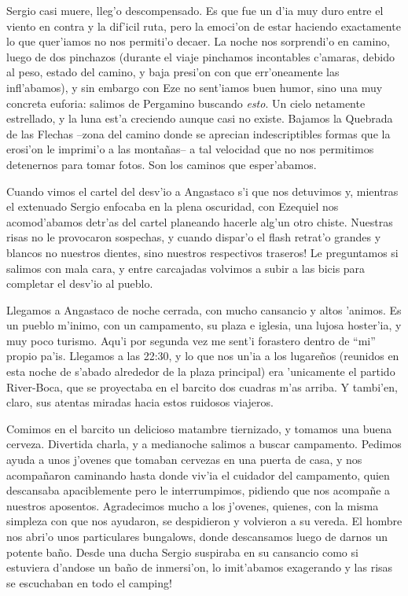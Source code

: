 Sergio casi muere, lleg'o descompensado. Es que fue un d'ia muy duro entre el
viento en contra y la dif'icil ruta, pero la emoci'on de estar haciendo
exactamente lo que quer'iamos no nos permiti'o decaer. La noche nos sorprendi'o
en camino, luego de dos pinchazos (durante el viaje pinchamos incontables
c'amaras, debido al peso, estado del camino, y baja presi'on con que
err'oneamente las infl'abamos), y sin embargo con Eze no sent'iamos buen humor,
sino una muy concreta euforia: salimos de Pergamino buscando \emph{esto}. Un
cielo netamente estrellado, y la luna est'a creciendo aunque casi no existe.
Bajamos la Quebrada de las Flechas --zona del camino donde se aprecian
indescriptibles formas que la erosi'on le imprimi'o a las monta\~nas-- a tal
velocidad que no nos permitimos detenernos para tomar fotos. Son los caminos que
esper'abamos.

Cuando vimos el cartel del desv'io a Angastaco s'i que nos detuvimos y, mientras
el extenuado Sergio enfocaba en la plena oscuridad, con Ezequiel nos
acomod'abamos detr'as del cartel planeando hacerle alg'un otro chiste. Nuestras
risas no le provocaron sospechas, y cuando dispar'o el flash retrat'o grandes y
blancos no nuestros dientes, \textexclamdown sino nuestros respectivos traseros!
Le preguntamos si salimos con mala cara, y entre carcajadas volvimos a subir a
las bicis para completar el desv'io al pueblo.

Llegamos a Angastaco de noche cerrada, con mucho cansancio y altos 'animos. Es
un pueblo m'inimo, con un campamento, su plaza e iglesia, una lujosa hoster'ia,
y muy poco turismo. Aqu'i por segunda vez me sent'i forastero dentro de ``mi''
propio pa'is. Llegamos a las 22:30, y lo que nos un'ia a los lugare\~nos
(reunidos en esta noche de s'abado alrededor de la plaza principal) era
'unicamente el partido River-Boca, que se proyectaba en el barcito dos cuadras
m'as arriba. Y tambi'en, claro, sus atentas miradas hacia estos ruidosos
viajeros.

Comimos en el barcito un delicioso matambre tiernizado, y tomamos una buena
cerveza. Divertida charla, y a medianoche salimos a buscar campamento. Pedimos
ayuda a unos j'ovenes que tomaban cervezas en una puerta de casa, y nos
acompa\~naron caminando hasta donde viv'ia el cuidador del campamento, quien
descansaba apaciblemente pero le interrumpimos, pidiendo que nos acompa\~ne a
nuestros aposentos. Agradecimos mucho a los j'ovenes, quienes, con la misma
simpleza con que nos ayudaron, se despidieron y volvieron a su vereda. El
hombre nos abri'o unos particulares bungalows, donde descansamos luego de darnos
un potente ba\~no. Desde una ducha Sergio suspiraba en su cansancio como si
estuviera d'andose un ba\~no de inmersi'on, \textexclamdown lo imit'abamos
exagerando y las risas se escuchaban en todo el camping!

